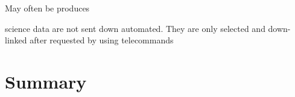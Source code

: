 \documentclass{aa}
\begin{document}
May often be produces 


science data are not sent down automated. They are only selected and down-linked after requested by 
using telecommands

\section{Summary}
\label{sec:summary}



%
%



\end{document}
